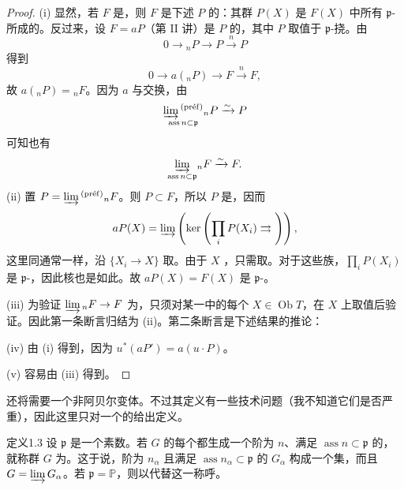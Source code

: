 \begin{proof}
(i) 显然，若 $F$ 是，则 $F$ 是下述 $P$ 的：其群 $P(X)$ 是 $F(X)$ 中所有 $\mathfrak p$-所成的。反过来，设 $F=aP$（第 II 讲）是 $P$ 的，其中 $P$ 取值于 $\mathfrak p$-挠。由
\[
0\longrightarrow{}_nP\longrightarrow P\xrightarrow{n}P
\]
得到
\[
0\longrightarrow a({}_nP)\longrightarrow F\xrightarrow{n}F,
\]
故 $a({}_nP)={}_nF$。因为 $a$ 与交换，由
\[
\underset{\operatorname{ass}n\subset\mathfrak p}{\varinjlim{}^{(\mathrm{pr\text{é}f})}}{}_nP\xrightarrow{\sim}P
\]
可知也有
\[
\underset{\operatorname{ass}n\subset\mathfrak p}{\varinjlim}{}_nF\xrightarrow{\sim}F.
\]
(ii) 置 $P=\varinjlim{}^{(\mathrm{pr\text{é}f})}{}_nF$。则 $P\subset F$，所以 $P$ 是，因而
\[
aP(X)=\varinjlim\left(\ker\left(\prod_iP(X_i)\rightrightarrows\ \right)\right),
\]
这里同通常一样，沿 $\{X_i\to X\}$ 取。由于 $X$ ，只需取。对于这些族，$\prod_iP(X_i)$ 是 $\mathfrak p$-，因此核也是如此。故 $aP(X)=F(X)$ 是 $\mathfrak p$-。

(iii) 为验证 $\varinjlim{}_nF\to F$ 为，只须对某一中的每个 $X\in\operatorname{Ob}T$，在 $X$ 上取值后验证。因此第一条断言归结为 (ii)。第二条断言是下述结果的推论：

(iv) 由 (i) 得到，因为 $u^*(aP')=a(u\mathbin{\cdot}P)$。

(v) 容易由 (iii) 得到。
\end{proof}
还将需要一个非阿贝尔变体。不过其定义有一些技术问题（我不知道它们是否严重），因此这里只对一个的给出定义。
\begin{SGAresult}{定义}{1.3}
设 $\mathfrak p$ 是一个素数。若 $G$ 的每个都生成一个阶为 $n$、满足 $\operatorname{ass}n\subset\mathfrak p$ 的，就称群 $G$ 为。这于说，阶为 $n_\alpha$ 且满足 $\operatorname{ass}n_\alpha\subset\mathfrak p$ 的 $G_\alpha$ 构成一个集，而且 $G=\varinjlim G_\alpha$。若 $\mathfrak p=\mathbb P$，则以代替这一称呼。
\end{SGAresult}
